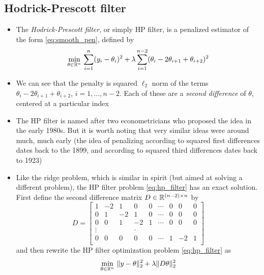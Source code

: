 \documentclass{article}
\begin{document}
\subsection{Hodrick-Prescott filter}

\begin{itemize}
\item The \emph{Hodrick-Prescott filter}, or simply HP filter, is a penalized 
  estimator of the form \eqref{eq:smooth_pen}, defined by 
  \begin{equation}
  \label{eq:hp_filter}
  \min_{\theta \in \mathbb{R}^n} \, \sum_{i=1}^n (y_i - \theta_i)^2 + \lambda
  \sum_{i=1}^{n-2} (\theta_i - 2\theta_{i+1} + \theta_{i+2})^2
  \end{equation}

\item We can see that the penalty is squared $\ell_2$ norm of the terms
  $\theta_i -  2\theta_{i+1} + \theta_{i+2}$, $i = 1,\dots,n-2$. Each of these
  are a \emph{second difference} of $\theta$, centered at a particular index 

\item The HP filter is named after two econometricians who proposed the idea in
  the early 1980s. But it is worth noting that very similar ideas were around
  much, much early (the idea of penalizing according to squared first
  differences dates back to the 1899, and according to squared third differences
  dates back to 1923)    

\item Like the ridge problem, which is similar in spirit (but aimed at solving a 
  different problem), the HP filter problem \eqref{eq:hp_filter} has an exact 
  solution. First define the second difference matrix $D \in \mathbb{R}^{(n-2) \times
    n}$ by 
  \begin{equation}
  \label{eq:d_mat}
  D = \begin{bmatrix}
  1 & -2 & 1 & 0 & 0 & \cdots & 0 & 0 & 0 \\
  0 & 1 & -2 & 1 & 0 & \cdots & 0 & 0 & 0 \\
  0 & 0 & 1 & -2 & 1 & \cdots & 0 & 0 & 0 \\
  \vdots & & & \cdot & & & \\
  0 & 0 & 0 & 0 & 0 & \cdots & 1 & -2 & 1 \\
  \end{bmatrix}
  \end{equation}
  and then rewrite the HP filter optimization problem \eqref{eq:hp_filter} as 
  \begin{equation}
  \label{eq:hp_filter2}
  \min_{\theta \in \mathbb{R}^n} \, \|y - \theta\|_2^2 + \lambda \|D \theta\|_2^2 
  \end{equation}


\end{itemize}
\end{document}
